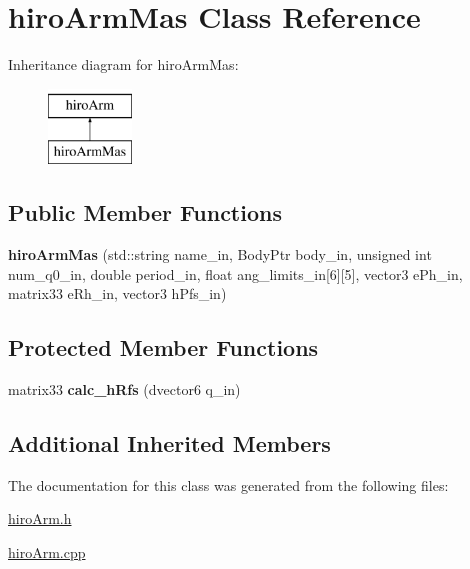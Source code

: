 \hypertarget{classhiroArmMas}{\section{hiro\-Arm\-Mas Class Reference}
\label{classhiroArmMas}
}
Inheritance diagram for hiro\-Arm\-Mas\-:\begin{figure}[H]
\begin{center}
\leavevmode
\includegraphics[height=2.000000cm]{classhiroArmMas}
\end{center}
\end{figure}
\subsection*{Public Member Functions}
\begin{DoxyCompactItemize}
\item 
\hypertarget{classhiroArmMas_aa665804de61cf4a7adf11ebe722611be}{{\bfseries hiro\-Arm\-Mas} (std\-::string name\-\_\-in, Body\-Ptr body\-\_\-in, unsigned int num\-\_\-q0\-\_\-in, double period\-\_\-in, float ang\-\_\-limits\-\_\-in\mbox{[}6\mbox{]}\mbox{[}5\mbox{]}, vector3 e\-Ph\-\_\-in, matrix33 e\-Rh\-\_\-in, vector3 h\-Pfs\-\_\-in)}\label{classhiroArmMas_aa665804de61cf4a7adf11ebe722611be}

\end{DoxyCompactItemize}
\subsection*{Protected Member Functions}
\begin{DoxyCompactItemize}
\item 
\hypertarget{classhiroArmMas_af1e337aade07c23bd776b9e923bacc46}{matrix33 {\bfseries calc\-\_\-h\-Rfs} (dvector6 q\-\_\-in)}\label{classhiroArmMas_af1e337aade07c23bd776b9e923bacc46}

\end{DoxyCompactItemize}
\subsection*{Additional Inherited Members}


The documentation for this class was generated from the following files\-:\begin{DoxyCompactItemize}
\item 
\hyperlink{hiroArm_8h}{hiro\-Arm.\-h}\item 
\hyperlink{hiroArm_8cpp}{hiro\-Arm.\-cpp}\end{DoxyCompactItemize}
